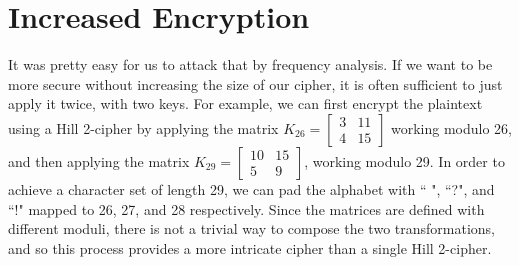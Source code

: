 \documentclass{article}
\begin{document}
\section{Increased Encryption}
It was pretty easy for us to attack that by frequency analysis. If we want to be more secure without increasing the size of our cipher, it is often sufficient to just apply it twice, with two keys. For example, we can first encrypt the plaintext using a Hill 2-cipher by applying the matrix $K_{26} = \begin{bmatrix}
    3 & 11 \\
    4 & 15
\end{bmatrix}$ working modulo 26, and then applying the matrix $K_{29} = \begin{bmatrix}
    10 & 15 \\
    5 & 9
\end{bmatrix}$, working modulo 29. In order to achieve a character set of length 29, we can pad the alphabet with `` ", ``?", and ``!" mapped to 26, 27, and 28 respectively. Since the matrices are defined with different moduli, there is not a trivial way to compose the two transformations, and so this process provides a more intricate cipher than a single Hill 2-cipher.
\end{document}
